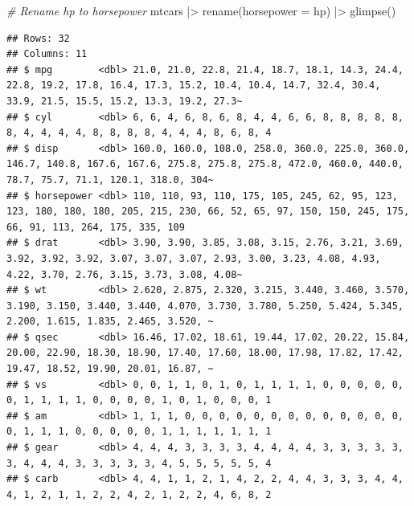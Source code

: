 \documentclass[
  12pt,
  oneside]{book}
\newenvironment{Shaded}{\begin{snugshade}}{\end{snugshade}}
\newcommand{\AttributeTok}[1]{\textcolor[rgb]{0.77,0.63,0.00}{#1}}
\newcommand{\CommentTok}[1]{\textcolor[rgb]{0.56,0.35,0.01}{\textit{#1}}}
\newcommand{\FunctionTok}[1]{\textcolor[rgb]{0.00,0.00,0.00}{#1}}
\newcommand{\NormalTok}[1]{#1}
\newcommand{\SpecialCharTok}[1]{\textcolor[rgb]{0.00,0.00,0.00}{#1}}
\theoremstyle{definition}
\theoremstyle{definition}
\theoremstyle{definition}
\theoremstyle{definition}
\theoremstyle{remark}
\begin{document}
\begin{Shaded}
\begin{Highlighting}[]
\CommentTok{\# Rename hp to horsepower}
\NormalTok{mtcars }\SpecialCharTok{|\textgreater{}} 
  \FunctionTok{rename}\NormalTok{(}\AttributeTok{horsepower =}\NormalTok{ hp) }\SpecialCharTok{|\textgreater{}} 
  \FunctionTok{glimpse}\NormalTok{()}
\end{Highlighting}
\end{Shaded}

\begin{verbatim}
## Rows: 32
## Columns: 11
## $ mpg        <dbl> 21.0, 21.0, 22.8, 21.4, 18.7, 18.1, 14.3, 24.4, 22.8, 19.2, 17.8, 16.4, 17.3, 15.2, 10.4, 10.4, 14.7, 32.4, 30.4, 33.9, 21.5, 15.5, 15.2, 13.3, 19.2, 27.3~
## $ cyl        <dbl> 6, 6, 4, 6, 8, 6, 8, 4, 4, 6, 6, 8, 8, 8, 8, 8, 8, 4, 4, 4, 4, 8, 8, 8, 8, 4, 4, 4, 8, 6, 8, 4
## $ disp       <dbl> 160.0, 160.0, 108.0, 258.0, 360.0, 225.0, 360.0, 146.7, 140.8, 167.6, 167.6, 275.8, 275.8, 275.8, 472.0, 460.0, 440.0, 78.7, 75.7, 71.1, 120.1, 318.0, 304~
## $ horsepower <dbl> 110, 110, 93, 110, 175, 105, 245, 62, 95, 123, 123, 180, 180, 180, 205, 215, 230, 66, 52, 65, 97, 150, 150, 245, 175, 66, 91, 113, 264, 175, 335, 109
## $ drat       <dbl> 3.90, 3.90, 3.85, 3.08, 3.15, 2.76, 3.21, 3.69, 3.92, 3.92, 3.92, 3.07, 3.07, 3.07, 2.93, 3.00, 3.23, 4.08, 4.93, 4.22, 3.70, 2.76, 3.15, 3.73, 3.08, 4.08~
## $ wt         <dbl> 2.620, 2.875, 2.320, 3.215, 3.440, 3.460, 3.570, 3.190, 3.150, 3.440, 3.440, 4.070, 3.730, 3.780, 5.250, 5.424, 5.345, 2.200, 1.615, 1.835, 2.465, 3.520, ~
## $ qsec       <dbl> 16.46, 17.02, 18.61, 19.44, 17.02, 20.22, 15.84, 20.00, 22.90, 18.30, 18.90, 17.40, 17.60, 18.00, 17.98, 17.82, 17.42, 19.47, 18.52, 19.90, 20.01, 16.87, ~
## $ vs         <dbl> 0, 0, 1, 1, 0, 1, 0, 1, 1, 1, 1, 0, 0, 0, 0, 0, 0, 1, 1, 1, 1, 0, 0, 0, 0, 1, 0, 1, 0, 0, 0, 1
## $ am         <dbl> 1, 1, 1, 0, 0, 0, 0, 0, 0, 0, 0, 0, 0, 0, 0, 0, 0, 1, 1, 1, 0, 0, 0, 0, 0, 1, 1, 1, 1, 1, 1, 1
## $ gear       <dbl> 4, 4, 4, 3, 3, 3, 3, 4, 4, 4, 4, 3, 3, 3, 3, 3, 3, 4, 4, 4, 3, 3, 3, 3, 3, 4, 5, 5, 5, 5, 5, 4
## $ carb       <dbl> 4, 4, 1, 1, 2, 1, 4, 2, 2, 4, 4, 3, 3, 3, 4, 4, 4, 1, 2, 1, 1, 2, 2, 4, 2, 1, 2, 2, 4, 6, 8, 2
\end{verbatim}
\end{document}
